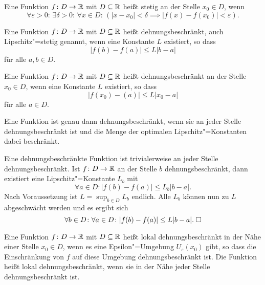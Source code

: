\begin{Definition}%
\label{cont}\newlinefirst
Eine Funktion $f\colon D\to\mathbb R$ mit $D\subseteq\mathbb R$ heißt stetig an der
Stelle $x_0\in D$, wenn%
\[\forall \varepsilon{>}0\colon\,\exists \delta{>}0\colon\,\forall x{\in}D\colon\,
(|x-x_0|<\delta\implies |f(x)-f(x_0)|<\varepsilon).\]
\end{Definition}

\begin{Definition}%
\newlinefirst
Eine Funktion $f\colon D\to\mathbb R$ mit $D\subseteq\mathbb R$ heißt
dehnungsbeschränkt, auch Lipschitz"=stetig genannt, wenn eine
Konstante $L$ existiert, so dass%
\[|f(b)-f(a)|\le L|b-a|\]
für alle $a,b\in D$.
\end{Definition}

\begin{Definition}%
\label{Lipschitz-cont-at}\newlinefirst
Eine Funktion $f\colon D\to\mathbb R$ mit $D\subseteq\mathbb R$ heißt
dehnungsbeschränkt an der Stelle $x_0\in D$, wenn eine Konstante $L$
existiert, so dass%
\[|f(x_0)-(a)|\le L|x_0-a|\]
für alle $a\in D$.
\end{Definition}

\begin{Satz}
Eine Funktion ist genau dann dehnungsbeschränkt, wenn sie an jeder
Stelle dehnungsbeschränkt ist und die Menge der optimalen
Lipschitz"=Konstanten dabei beschränkt.
\end{Satz}
\begin{Beweis}
Eine dehnungsbeschränkte Funktion ist trivialerweise an jeder Stelle
dehnungsbeschränkt. Ist $f\colon D\to\mathbb R$ an der Stelle $b$
dehnungsbeschränkt, dann existiert eine Lipschitz"=Konstante $L_b$ mit%
\[\forall a\in D\colon |f(b)-f(a)|\le L_b |b-a|.\]
Nach Voraussetzung ist $L=\sup_{b\in D} L_b$ endlich. Alle $L_b$ können
nun zu $L$ abgeschwächt werden und es ergibt sich%
\[\forall b\in D\colon\forall a\in D\colon |f(b)-f(a)|\le L|b-a|.\;\square\]
\end{Beweis}


\begin{Definition}\newlinefirst
Eine Funktion $f\colon D\to\mathbb R$ mit $D\subseteq\mathbb R$ heißt lokal
dehnungsbeschränkt in der Nähe einer Stelle $x_0\in D$, wenn es eine
Epsilon"=Umgebung $U_\varepsilon(x_0)$ gibt, so dass die Einschränkung
von $f$ auf diese Umgebung dehnungsbeschränkt ist. Die Funktion heißt
lokal dehnungsbeschränkt, wenn sie in der Nähe jeder Stelle
dehnungsbeschränkt ist.
\end{Definition}

